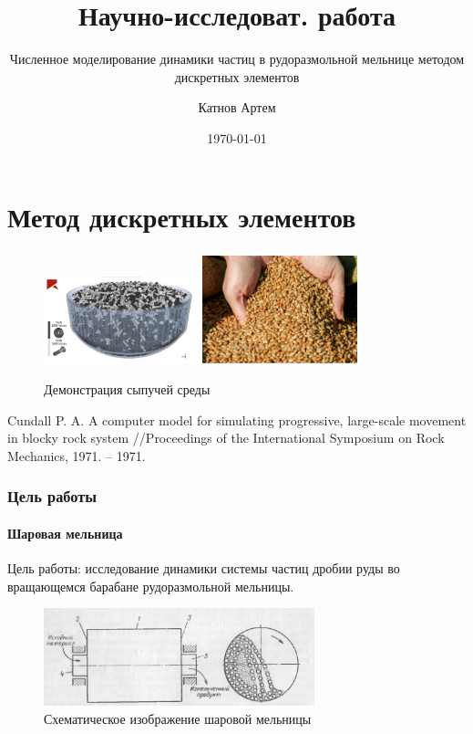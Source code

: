 \documentclass[c]{beamer}  %
\title{Научно-исследоват. работа}
\subtitle{Численное моделирование динамики частиц в рудоразмольной мельнице методом дискретных элементов}
\author{Катнов Артем}
\date{\today}
\institute[Факультет робототехники и комплексной автоматизации]{Московский государственный технический университет им. Н.Э.Баумана}
\begin{document}
\begin{frame}
\maketitle
\end{frame}


\begin{frame}
\tableofcontents
\end{frame}

\section{Метод дискретных элементов}

\begin{frame}
\frametitle{\insertsection} 
\framesubtitle{\insertsubsection}

\begin{figure}[h!]
	\centering
	\includegraphics[width=0.4\textwidth]{sreda}
	\includegraphics[width=0.4\textwidth]{sreda2}
	\caption{Демонстрация сыпучей среды}
\end{figure} 

Cundall P. A. A computer model for simulating progressive, large-scale movement in blocky rock system //Proceedings of the International Symposium on Rock Mechanics, 1971. – 1971.

\end{frame}

\begin{frame}
\frametitle{Цель работы} 
\framesubtitle{Шаровая мельница}

Цель работы: исследование динамики системы частиц дробии руды во вращающемся барабане рудоразмольной мельницы.

\begin{figure}[h!]
	\centering
	\includegraphics[width=0.7\textwidth]{baraban_shema}
	\caption{Схематическое изображение шаровой мельницы}
\end{figure}

 
\end{frame}
\end{document}
